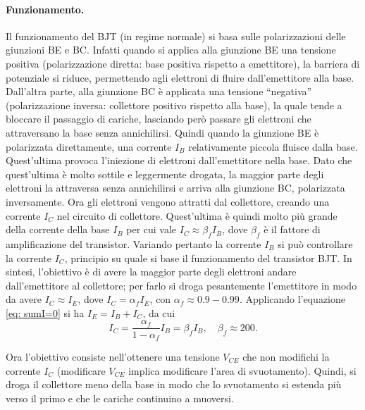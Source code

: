 \paragraph{Funzionamento.} Il funzionamento del BJT (in regime normale) si basa sulle polarizzazioni delle giunzioni BE e BC. Infatti quando si applica alla giunzione BE una tensione positiva (polarizzazione diretta: base positiva rispetto a emettitore), la barriera di potenziale si riduce, permettendo agli elettroni di fluire dall'emettitore alla base. Dall'altra parte, alla giunzione BC è applicata una tensione ``negativa'' (polarizzazione inversa: collettore positivo rispetto alla base), la quale tende a bloccare il passaggio di cariche, lasciando però passare gli elettroni che attraversano la base senza annichilirsi. Quindi quando la giunzione BE è polarizzata direttamente, una corrente $I_B$ relativamente piccola fluisce dalla base. Quest'ultima provoca l'iniezione di elettroni dall'emettitore nella base. Dato che quest'ultima è molto sottile e leggermente drogata, la maggior parte degli elettroni la attraversa senza annichilirsi e arriva alla giunzione BC, polarizzata inversamente. Ora gli elettroni vengono attratti dal collettore, creando una corrente $I_C$ nel circuito di collettore. Quest'ultima è quindi molto più grande della corrente della base $I_B$ per cui vale $I_C\approx \beta_f I_B$, dove $\beta_f$ è il fattore di amplificazione del transistor. Variando pertanto la corrente $I_B$ si può controllare la corrente $I_C$, principio su quale si base il funzionamento del transistor BJT. In sintesi, l'obiettivo è di avere la maggior parte degli elettroni andare dall'emettitore al collettore; per farlo si droga pesantemente l'emettitore in modo da avere $I_C\approx I_E$, dove $I_C=\alpha_f I_E$, con $\alpha_f\approx0.9-0.99$. Applicando l'equazione \eqref{eq: sumI=0} si ha $I_E=I_B+I_C$, da cui
\begin{equation}
    I_C=\frac{\alpha_f}{1-\alpha_f}I_B=\beta_f I_B,\quad\beta_f\approx200.
\end{equation}

Ora l'obiettivo consiste nell'ottenere una tensione $V_{CE}$ che non modifichi la corrente $I_C$ (modificare $V_{CE}$ implica modificare l'area di svuotamento). Quindi, si droga il collettore meno della base in modo che lo svuotamento si estenda più verso il primo e che le cariche continuino a muoversi.


